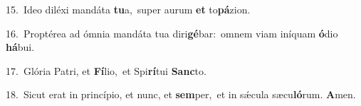 {\numbfont\textcolor{\numbcolor}{15.}}~Ideo diléxi mandáta \textbf{tu}\-a,~\star super aurum \textbf{et} to\-\textbf{pá}\-zion.\par
{\numbfont\textcolor{\numbcolor}{16.}}~Proptérea ad ómnia mandáta tua diri\-\textbf{gé}\-bar:~\star omnem viam iníquam \textbf{ó}\-dio \textbf{há}\-bui.\par
{\numbfont\textcolor{\numbcolor}{17.}}~Glória Patri, et \textbf{Fí}\-lio,~\star et Spi\-\textbf{rí}\-tui \textbf{Sanc}\-to.\par
{\numbfont\textcolor{\numbcolor}{18.}}~Sicut erat in princípio, et nunc, et \textbf{sem}\-per,~\star et in sǽcula sæcu\-\textbf{ló}\-rum. \textbf{A}\-men.\par
